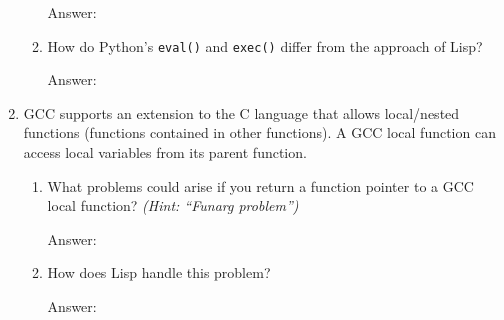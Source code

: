 \documentclass[12pt,letterpaper]{ntdhw}
\begin{document}
\begin{enumerate}
\begin{enumerate}
    \begin{emph}
      Answer: %
    \end{emph}

    \item How do Python's {\tt eval()} and {\tt exec()} differ from
    the approach of Lisp?

    \begin{emph}
      Answer: %
    \end{emph}
  \end{enumerate}

  \item GCC supports an extension to the C language that allows
  local/nested functions (functions contained in other functions).  A
  GCC local function can access local variables from its parent
  function.
  \begin{enumerate}
    \item What problems could arise if you return a function pointer
    to a GCC local function? \emph{(Hint: ``Funarg problem'')}

    \begin{emph}
      Answer: %
    \end{emph}

    \item How does Lisp handle this problem?

    \begin{emph}
      Answer: %
    \end{emph}

  \end{enumerate}

\end{enumerate}
\end{document}
